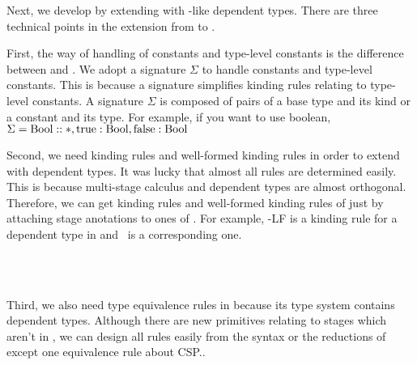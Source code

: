 
Next, we develop \LMD by extending \LTP with \LLF-like dependent types.
There are three technical points in the extension from \LTP to \LMD.


First, the way of handling of constants and type-level constants is the difference between \LMD and \LTP.
We adopt a signature $\Sigma$ to handle constants and type-level constants.
This is because a signature simplifies kinding rules relating to type-level constants.
A signature $\Sigma$ is composed of pairs of a base type and its kind or a constant and its type.
For example, if you want to use boolean, $\Sigma = \textrm{Bool}::*, \text{true}:\textrm{Bool}, \text{false}:\textrm{Bool}$


Second, we need kinding rules and well-formed kinding rules in order to extend \LMD with dependent types.
It was lucky that almost all rules are determined easily.
This is because multi-stage calculus and dependent types are almost orthogonal.
Therefore, we can get kinding rules and well-formed kinding rules of \LMD just by 
attaching stage anotations to ones of \LLF.
For example, \KAbs-LF is a kinding rule for a dependent type in \LLF and \KAbs\ is a corresponding one.
\begin{center}
	 \\[2mm]
	 \\[2mm]
\end{center}


Third, we also need type equivalence rules in \LMD because its type system contains dependent types.
Although there are new primitives relating to stages which aren't in \LLF,
we can design all rules easily from the syntax or the reductions of \LMD except one equivalence rule about CSP..